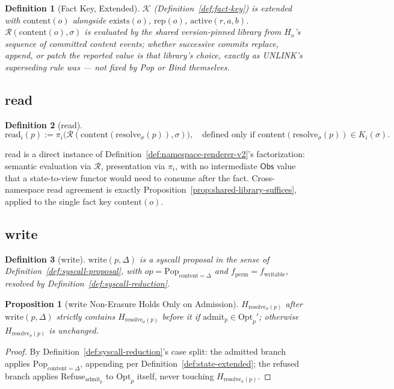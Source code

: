 \documentclass[11pt]{article}
\newtheorem{definition}{Definition}[section]
\newtheorem{proposition}{Proposition}[section]
\begin{document}
\begin{definition}[Fact Key, Extended]
\label{def:fact-key-v2}
$\mathcal{K}$ (Definition~\ref{def:fact-key}) is extended with $\mathrm{content}(o)$ alongside $\mathrm{exists}(o)$, $\mathrm{rep}(o)$, $\mathrm{active}(r,a,b)$. $\mathcal{R}(\mathrm{content}(o), \sigma)$ is evaluated by the shared version-pinned library from $H_o$'s sequence of committed content events; whether successive commits replace, append, or patch the reported value is that library's choice, exactly as UNLINK's superseding rule was --- not fixed by Pop or Bind themselves.
\end{definition}

\subsection{read}

\begin{definition}[read]
\label{def:read-v2}
\[
\mathrm{read}_i(p) := \pi_i\big(\mathcal{R}(\mathrm{content}(\mathrm{resolve}_\sigma(p)), \sigma)\big),
\quad \text{defined only if } \mathrm{content}(\mathrm{resolve}_\sigma(p)) \in K_i(\sigma).
\]
\end{definition}

read is a direct instance of Definition~\ref{def:namespace-renderer-v2}'s factorization: semantic evaluation via $\mathcal{R}$, presentation via $\pi_i$, with no intermediate $\mathsf{Obs}$ value that a state-to-view functor would need to consume after the fact. Cross-namespace read agreement is exactly Proposition~\ref{prop:shared-library-suffices}, applied to the single fact key $\mathrm{content}(o)$.

\subsection{write}

\begin{definition}[write]
\label{def:write-v2}
$\mathrm{write}(p, \Delta)$ is a syscall proposal in the sense of Definition~\ref{def:syscall-proposal}, with $\mathit{op} = \mathrm{Pop}_{\mathrm{content}=\Delta}$ and $f_{\mathrm{perm}} = f_{\mathrm{writable}}$, resolved by Definition~\ref{def:syscall-reduction}.
\end{definition}

\begin{proposition}[write Non-Erasure Holds Only on Admission]
\label{prop:write-nonerasure-v2}
$H_{\mathrm{resolve}_\sigma(p)}$ after $\mathrm{write}(p,\Delta)$ strictly contains $H_{\mathrm{resolve}_\sigma(p)}$ before it if $\mathrm{admit}_p \in \mathrm{Opt}_p'$; otherwise $H_{\mathrm{resolve}_\sigma(p)}$ is unchanged.
\end{proposition}
\begin{proof}
By Definition~\ref{def:syscall-reduction}'s case split: the admitted branch applies $\mathrm{Pop}_{\mathrm{content}=\Delta}$, appending per Definition~\ref{def:state-extended}; the refused branch applies $\mathrm{Refuse}_{\mathrm{admit}_p}$ to $\mathrm{Opt}_p$ itself, never touching $H_{\mathrm{resolve}_\sigma(p)}$.
\end{proof}
\end{document}
